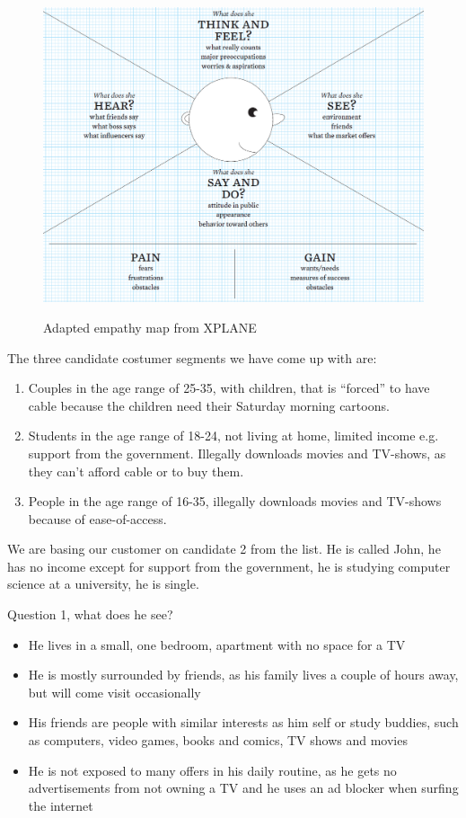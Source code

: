 \begin{figure}[h]
    \begin{center}
        \includegraphics[scale=0.52]{./pics/empathy_map}
        \label{fig:empathy_map}
        \caption{Adapted empathy map from XPLANE\cite{130}}
    \end{center}
\end{figure}

The three candidate costumer segments we have come up with are:
\begin{enumerate}
\item Couples in the age range of 25-35, with children, that is ``forced'' to have cable because the children need their Saturday morning cartoons.
\item Students in the age range of 18-24, not living at home, limited income e.g. support from the government. Illegally downloads movies and TV-shows, as they can't afford cable or to buy them.
\item People in the age range of 16-35, illegally downloads movies and TV-shows because of ease-of-access.
\end{enumerate}

We are basing our customer on candidate 2 from the list. He is called John, he has no income except for support from the government, he is studying computer science at a university, he is single.

Question 1, what does he see?
\begin{itemize}
\item He lives in a small, one bedroom, apartment with no space for a TV
\item He is mostly surrounded by friends, as his family lives a couple of hours away, but will come visit occasionally 
\item His friends are people with similar interests as him self or study buddies, such as computers, video games, books and comics, TV shows and movies
\item He is not exposed to many offers in his daily routine, as he gets no advertisements from not owning a TV and he uses an ad blocker when surfing the internet
\end{itemize}

